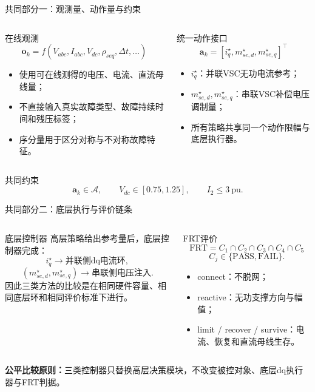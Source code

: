 \documentclass[10pt,aspectratio=169,mathserif]{beamer}
\newcommand{\pass}{\ensuremath{\mathrm{PASS}}}
\newcommand{\fail}{\ensuremath{\mathrm{FAIL}}}
\begin{document}
\begin{frame}{共同部分一：观测量、动作量与约束}
\begin{columns}[T,onlytextwidth]
\begin{block}{在线观测}
\[
\bm o_k=
f(V_{abc},I_{abc},V_{dc},\rho_{seq},\Delta t,\ldots)
\]
\begin{itemize}
  \item 使用可在线测得的电压、电流、直流母线量；
  \item 不直接输入真实故障类型、故障持续时间和残压标签；
  \item 序分量用于区分对称与不对称故障特征。
\end{itemize}
\end{block}

\begin{block}{统一动作接口}
\[
\bm a_k=[i_q^\star,m_{se,d}^\star,m_{se,q}^\star]^\top
\]
\begin{itemize}
  \item $i_q^\star$：并联VSC无功电流参考；
  \item $m_{se,d}^\star,m_{se,q}^\star$：串联VSC补偿电压调制量；
  \item 所有策略共享同一个动作限幅与底层执行器。
\end{itemize}
\end{block}
\end{columns}

\begin{block}{共同约束}
\[
\bm a_k\in\mathcal A,\qquad
V_{dc}\in[0.75,1.25],\qquad
I_2\le 3~\mathrm{pu}.
\]
\end{block}
\end{frame}

\begin{frame}{共同部分二：底层执行与评价链条}
\begin{columns}[T,onlytextwidth]
\begin{block}{底层控制器}
高层策略给出参考量后，底层控制器完成：
\[
i_q^\star \rightarrow \text{并联侧dq电流环},
\]
\[
(m_{se,d}^\star,m_{se,q}^\star)
\rightarrow \text{串联侧电压注入}.
\]
因此三类方法的比较是在相同硬件容量、相同底层环和相同评价标准下进行。
\end{block}

\begin{block}{FRT评价}
\[
\mathrm{FRT}=C_1\cap C_2\cap C_3\cap C_4\cap C_5
\]
\[
C_j\in\{\pass,\fail\}.
\]
\begin{itemize}
  \item connect：不脱网；
  \item reactive：无功支撑方向与幅值；
  \item limit / recover / survive：电流、恢复和直流母线生存。
\end{itemize}
\end{block}
\end{columns}

\medskip
\textbf{公平比较原则：}三类控制器只替换高层决策模块，不改变被控对象、底层dq执行器与FRT判据。
\end{frame}
\end{document}
